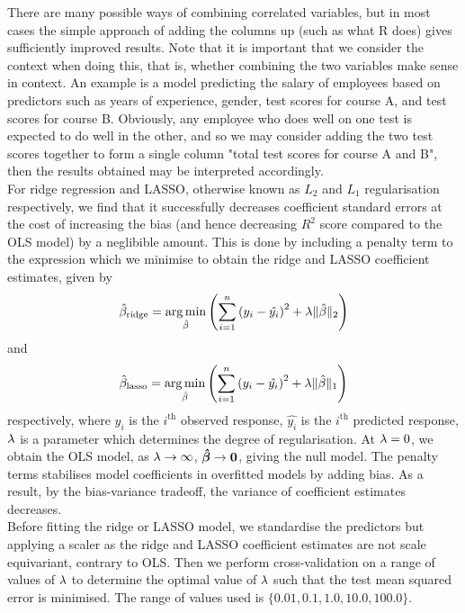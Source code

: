 \documentclass[12pt]{article}
\DeclareMathOperator*{\argmin}{arg\,min}
\newcommand{\gbh}{\hat{\gb}}
\newcommand{\bmgbh}{\boldsymbol{\gbh}}
\begin{document}
	There are many possible ways of combining correlated variables, but in most cases the simple approach of adding the columns up (such as what R does) gives sufficiently improved results. Note that it is important that we consider the context when doing this, that is, whether combining the two variables make sense in context. An example is a model predicting the salary of employees based on predictors such as years of experience, gender, test scores for course A, and test scores for course B. Obviously, any employee who does well on one test is expected to do well in the other, and so we may consider adding the two test scores together to form a single column "total test scores for course A and B", then the results obtained may be interpreted accordingly.\\
	
	
	For ridge regression and LASSO, otherwise known as $L_2$ and $L_1$ regularisation respectively, we find that it successfully decreases coefficient standard errors at the cost of increasing the bias (and hence decreasing $R^2$ score compared to the OLS model) by a neglibible amount. This is done by including a penalty term to the expression which we minimise to obtain the ridge and LASSO coefficient estimates, given by
	\begin{equation}
		\gbh_{\text{ridge}}=\argmin_{\gbh}\lt( \sum_{i=1}^{n}\lt(y_i-\hat{y_i}\rt)^2+\lm\|\gbh\|_2\rt) 
	\end{equation}
	and
	\begin{equation}
		\gbh_{\text{lasso}}=\argmin_{\gbh}\lt( \sum_{i=1}^{n}\lt(y_i-\hat{y_i}\rt)^2+\lm\|\gbh\|_1\rt)
	\end{equation}
	respectively, where $y_i$ is the $i^{\text{th}}$ observed response, $\hat{y_i}$ is the $i^{\text{th}}$ predicted response, $\lambda$ is a parameter which determines the degree of regularisation. At $\lambda=0$, we obtain the OLS model, as $\lambda\rightarrow\infty$, $\bmgbh\rightarrow \bzero$, giving the null model. The penalty terms stabilises model coefficients in overfitted models by adding bias. As a result, by the bias-variance tradeoff, the variance of coefficient estimates decreases.\\

	Before fitting the ridge or LASSO model, we standardise the predictors but applying a scaler as the ridge and LASSO coefficient estimates are not scale equivariant, contrary to OLS. Then we perform cross-validation on a range of values of $\lambda$ to determine the optimal value of $\lambda$ such that the test mean squared error is minimised. The range of values used is $\{0.01,0.1,1.0,10.0,100.0\}$. 
	
\end{document}
